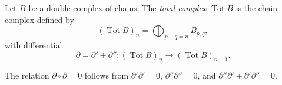 Let $B$ be a double complex of chains. The \emph{total complex} $\operatorname{Tot} B$ is the chain complex defined by
$$(\operatorname{Tot} B)_n = \bigoplus_{p+q=n} B_{p,q},$$
with differential
$$\partial = \partial' + \partial'' : (\operatorname{Tot} B)_n \rightarrow (\operatorname{Tot} B)_{n-1}.$$

The relation $\partial \circ \partial = 0$ follows from $\partial' \partial' = 0$, $\partial'' \partial'' = 0$, and $\partial'' \partial' + \partial' \partial'' = 0$.

